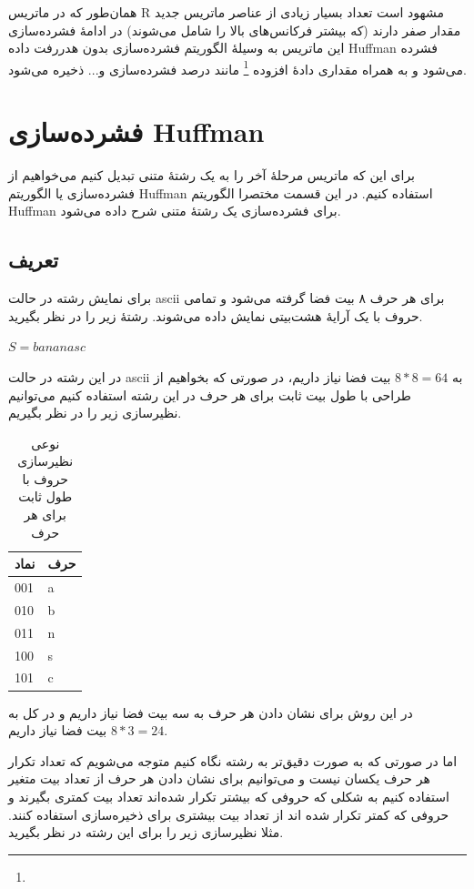همان‌طور که در ماتریس R مشهود است تعداد بسیار زیادی از عناصر ماتریس جدید
مقدار صفر دارند (که بیشتر فرکانس‌های بالا را شامل می‌شوند)
در ادامهٔ فشرده‌سازی این ماتریس به وسیلهٔ الگوریتم فشرده‌‌سازی بدون هدررفت داده
Huffman 
فشرده می‌شود و به همراه مقداری 
دادهٔ افزوده 
\footnote{}
مانند درصد فشرده‌سازی و... ذخیره می‌شود. 

\section{فشرده‌سازی Huffman}
برای این که ماتریس مرحلهٔ آخر را به یک رشتهٔ متنی تبدیل کنیم می‌خواهیم از 
فشرده‌سازی یا الگوریتم Huffman استفاده کنیم.
در این قسمت مختصرا الگوریتم Huffman برای فشرده‌سازی یک رشتهٔ متنی شرح داده می‌شود.

\subsection{تعریف}
برای نمایش رشته در حالت 
ascii 
برای هر حرف ۸ بیت فضا گرفته می‌شود و تمامی حروف با یک آرایهٔ هشت‌بیتی
نمایش داده می‌شوند. رشتهٔ زیر را در نظر بگیرید.
\begin{center}
        $S = bananasc$
\end{center}

در این رشته در حالت ascii به 
$ 8 * 8 = 64$ 
بیت فضا نیاز داریم، در صورتی که بخواهیم از طراحی 
با طول بیت ثابت برای هر حرف در این رشته استفاده کنیم می‌توانیم نظیرسازی 
زیر را در نظر بگیریم. 

\begin{table}[h]
        \centering
        \caption{نوعی نظیرسازی حروف با طول ثابت برای هر حرف}
        \label{huffman}
        \begin{tabular}{ll}
        \hline
        نماد & حرف \\ \hline
        001 & a \\
        010 & b \\
        011 & n \\
        100 & s \\
        101 & c \\ \hline
        \end{tabular}
\end{table}

در این روش برای نشان دادن هر حرف به سه بیت فضا نیاز داریم و در کل به
$ 8 * 3 = 24 $
بیت فضا نیاز داریم. 

اما در صورتی که به صورت دقیق‌تر به رشته نگاه کنیم متوجه می‌شویم که تعداد تکرار هر حرف
یکسان نیست و می‌توانیم برای نشان دادن هر حرف از تعداد بیت متغیر استفاده کنیم به شکلی که 
حروفی که بیشتر تکرار شده‌اند تعداد بیت کمتری بگیرند و حروفی که کمتر تکرار
شده اند از تعداد بیت بیشتری برای ذخیره‌‌سازی استفاده کنند. مثلا نظیرسازی زیر 
را برای این رشته در نظر بگیرید.

